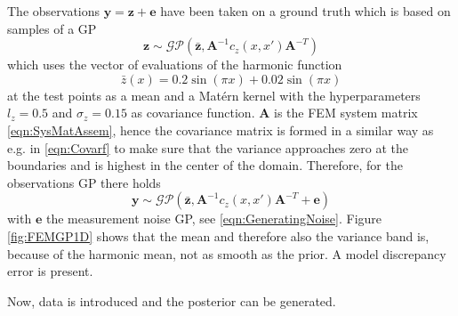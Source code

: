 \documentclass[%
  a4paper,oneside,%
  11pt,%
  smallchapters,
  style=printdev,
  extramargin,
  green,%
  rgb, <cmyk>
  ]{tubsbook}
\begin{document}
The observations $\bm{y} = \bm{z} +\bm{e}$ have been taken on a ground truth which is based on samples of a GP 
\begin{equation}
\bm{z} \sim \mathcal{GP}(\bar{\bm{z}},\bm{A}^{-1}c_z(x,x')\bm{A}^{-T})
\label{eqn:zGP}
\end{equation}
which uses the vector of evaluations of the harmonic function
\begin{equation}
\bar{z}(x) = 0.2\sin(\pi x) + 0.02\sin(\pi x)
\end{equation}
at the test points as a mean and a Mat\'ern kernel with the hyperparameters $l_z=0.5$ and $\sigma_z = 0.15$ as covariance function. $\bm{A}$ is the FEM system matrix \eqref{eqn:SysMatAssem}, hence the covariance matrix is formed in a similar way as e.g. in \eqref{eqn:Covarf} to make sure that the variance approaches zero at the boundaries and is highest in the center of the domain. Therefore, for the observations GP there holds
\begin{equation}
\bm{y} \sim \mathcal{GP}(\bar{\bm{z}},\bm{A}^{-1}c_z(x,x')\bm{A}^{-T} + \bm{e})
\end{equation}
with $\bm{e}$ the measurement noise GP, see \eqref{eqn:GeneratingNoise}.
Figure \ref{fig:FEMGP1D} shows that the mean and therefore also the variance band is, because of the harmonic mean, not as smooth as the prior. A model discrepancy error is present. 

Now, data is introduced and the posterior can be generated.



\FloatBarrier
\end{document}

